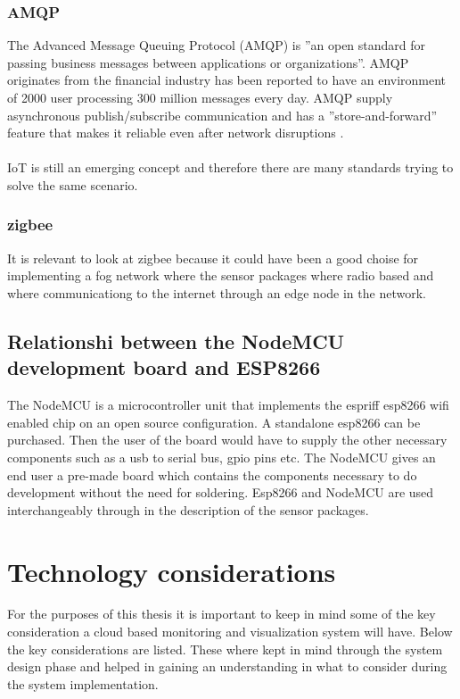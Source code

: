 \documentclass[]{uiophd}
\begin{document}
\subsection{AMQP}
The Advanced Message Queuing Protocol (AMQP) is ''an open standard for passing business messages between applications or organizations''\cite{amqp}. AMQP originates from the financial industry has been reported to have an environment of 2000 user processing 300 million messages every day. AMQP supply asynchronous publish/subscribe communication and has a ''store-and-forward'' feature that makes it reliable even after network disruptions \cite{karagiannis2015survey}. 
\\\\
IoT is still an emerging concept and therefore there are many standards trying to solve the same scenario.

\subsection{zigbee}
It is relevant to look at zigbee because it could have been a good choise for implementing a fog network where the sensor packages where radio based and where communicationg to the internet through an edge node in the network.

\section{Relationshi between the NodeMCU development board and ESP8266}
The NodeMCU is a microcontroller unit that implements the espriff esp8266 wifi enabled chip on an open source configuration. A standalone esp8266 can be purchased. Then the user of the board would have to supply the other necessary components such as a usb to serial bus, gpio pins etc. The NodeMCU gives an end user a pre-made board which contains the components necessary to do development without the need for soldering. Esp8266 and NodeMCU are used interchangeably through in the description of the sensor packages.

\chapter{Technology considerations}


For the purposes of this thesis it is important to keep in mind some of the key consideration a cloud based monitoring and visualization system will have. Below the key considerations are listed. These where kept in mind through the system design phase and helped in gaining an understanding in what to consider during the system implementation.
\end{document}
